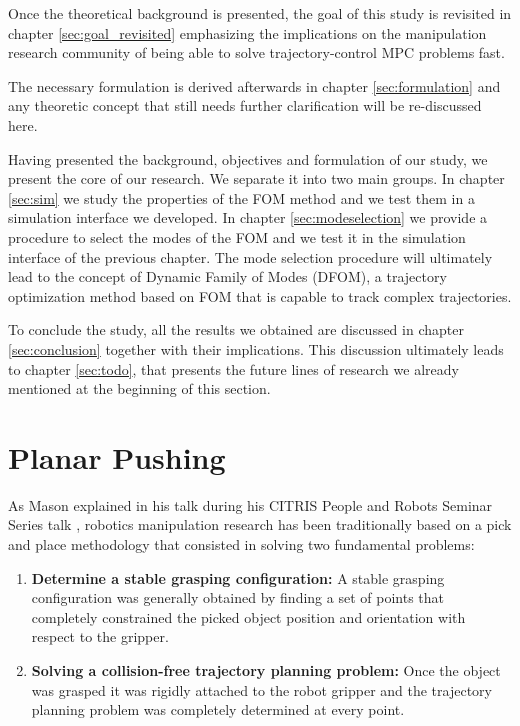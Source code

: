 \documentclass[12,twoside]{TFG-GM}
\theoremstyle{definition}
\theoremstyle{remark}
\begin{document}
Once the theoretical background is presented, the goal of this study is revisited in chapter \ref{sec:goal_revisited} emphasizing the implications on the manipulation research community of being able to solve trajectory-control MPC problems fast.

The necessary formulation is derived afterwards in chapter \ref{sec:formulation} and any theoretic concept that still needs further clarification will be re-discussed here.

Having presented the background, objectives and formulation of our study, we present the core of our research. We separate it into two main groups. In chapter \ref{sec:sim} we study the properties of the FOM method and we test them in a simulation interface we developed. In chapter \ref{sec:modeselection} we provide a procedure to select the modes of the FOM and we test it in the simulation interface of the previous chapter. The mode selection procedure will ultimately lead to the concept of Dynamic Family of Modes (DFOM), a trajectory optimization method based on FOM that is capable to track complex trajectories.

To conclude the study, all the results we obtained are discussed in chapter \ref{sec:conclusion} together with their implications. This discussion ultimately leads to chapter \ref{sec:todo}, that presents the future lines of research we already mentioned at the beginning of this section.

\section{Planar Pushing}
\label{sec:intro}

As Mason explained in his talk during his CITRIS People and Robots Seminar Series talk \cite{mason_talk}, robotics manipulation research has been traditionally based on a pick and place methodology that consisted in solving two fundamental problems:
\begin{enumerate}
\item{ \textbf{Determine a stable grasping configuration:}} A stable grasping configuration was generally obtained by finding a set of points that completely constrained the picked object position and orientation with respect to the gripper.
\item{ \textbf{Solving a collision-free trajectory planning problem:}} Once the object was grasped it was rigidly attached to the robot gripper and the trajectory planning problem was completely determined at every point.
\end{enumerate}
\end{document}
